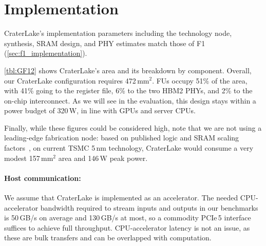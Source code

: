 \section{Implementation}\label{sec:implementation}

\tblGF

CraterLake's implementation parameters including the technology node,
synthesis, SRAM design, and PHY estimates match those of F1
(\autoref{sec:f1_implementation}).

\autoref{tbl:GF12} shows CraterLake's area and its breakdown by component.
Overall, our CraterLake configuration requires 472\,mm$^2$. FUs occupy 51\% of
the area, with 41\% going to the register file, 6\% to the two HBM2 PHYs, and
2\% to the on-chip interconnect. As we will see in the evaluation, this design
stays within a power budget of 320\,W, in line with GPUs and server CPUs.

Finally, while these figures could be considered high, note that we are not
using a leading-edge fabrication node: based on published logic and SRAM
scaling factors~\cite{yeap:iedm19:tsmc-n5}, on current TSMC 5\,nm technology,
CraterLake would consume a very modest 157\,mm$^\textrm{2}$ area and 146\,W
peak power.

\paragraph{Host communication:}
We assume that CraterLake is implemented as an accelerator. The needed
CPU-accelerator bandwidth required to stream inputs and outputs in our
benchmarks is 50\,GB/s on average and 130\,GB/s at most, so a commodity PCIe\,5
interface suffices to achieve full throughput. CPU-accelerator latency is not
an issue, as these are bulk transfers and can be overlapped with computation.

